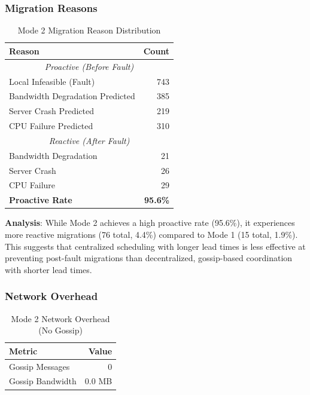 \documentclass[12pt,a4paper]{article}
\begin{document}
\subsubsection{Migration Reasons}

\begin{table}[h]
\centering
\begin{tabular}{@{}lr@{}}
\toprule
\textbf{Reason} & \textbf{Count} \\ \midrule
\multicolumn{2}{c}{\textit{Proactive (Before Fault)}} \\
Local Infeasible (Fault) & 743 \\
Bandwidth Degradation Predicted & 385 \\
Server Crash Predicted & 219 \\
CPU Failure Predicted & 310 \\
\midrule
\multicolumn{2}{c}{\textit{Reactive (After Fault)}} \\
Bandwidth Degradation & 21 \\
Server Crash & 26 \\
CPU Failure & 29 \\
\midrule
\textbf{Proactive Rate} & \textbf{95.6\%} \\ \bottomrule
\end{tabular}
\caption{Mode 2 Migration Reason Distribution}
\label{tab:mode2-reasons}
\end{table}

\textbf{Analysis}: While Mode 2 achieves a high proactive rate (95.6\%), it experiences more reactive migrations (76 total, 4.4\%) compared to Mode 1 (15 total, 1.9\%). This suggests that centralized scheduling with longer lead times is less effective at preventing post-fault migrations than decentralized, gossip-based coordination with shorter lead times.

\subsubsection{Network Overhead}

\begin{table}[h]
\centering
\begin{tabular}{@{}lr@{}}
\toprule
\textbf{Metric} & \textbf{Value} \\ \midrule
Gossip Messages & 0 \\
Gossip Bandwidth & 0.0 MB \\ \bottomrule
\end{tabular}
\caption{Mode 2 Network Overhead (No Gossip)}
\label{tab:mode2-network}
\end{table}
\end{document}
